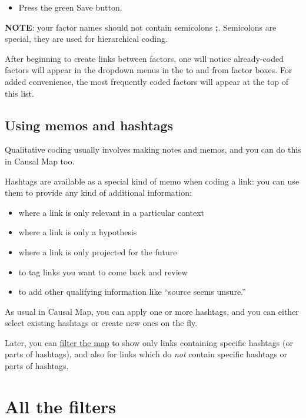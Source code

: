 \documentclass[
]{book}
\providecommand{\tightlist}{%
  \setlength{\itemsep}{0pt}\setlength{\parskip}{0pt}}
\begin{document}
\begin{itemize}
\tightlist
\item
  Press the green Save button.
\end{itemize}

\textbf{NOTE}: your factor names should not contain semicolons \textbf{;}. Semicolons are special, they are used for hierarchical coding.

After beginning to create links between factors, one will notice already-coded factors will appear in the dropdown menus in the to and from factor boxes. For added convenience, the most frequently coded factors will appear at the top of this list.

\hypertarget{using-memos-and-hashtags}{%
\section{Using memos and hashtags}\label{using-memos-and-hashtags}}

Qualitative coding usually involves making notes and memos, and you can do this in Causal Map too.

Hashtags are available as a special kind of memo when coding a link: you can use them to provide any kind of additional information:

\begin{itemize}
\tightlist
\item
  where a link is only relevant in a particular context
\item
  where a link is only a hypothesis
\item
  where a link is only projected for the future
\item
  to tag links you want to come back and review
\item
  to add other qualifying information like ``source seems unsure.''
\end{itemize}

As usual in Causal Map, you can apply one or more hashtags, and you can either select existing hashtags or create new ones on the fly.

Later, you can \href{https://guide.causalmap.app/analysis.html\#filtering-the-map-by-link-hashtag-memo}{filter the map} to show only links containing specific hashtags (or parts of hashtags), and also for links which do \emph{not} contain specific hashtags or parts of hashtags.

\hypertarget{all-the-filters}{%
\chapter{All the filters}\label{all-the-filters}}
\end{document}
